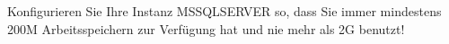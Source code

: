 \item Konfigurieren Sie Ihre Instanz MSSQLSERVER so, dass Sie immer
mindestens 200M Arbeitsspeichern zur Verfügung hat und nie mehr als 2G
benutzt!
